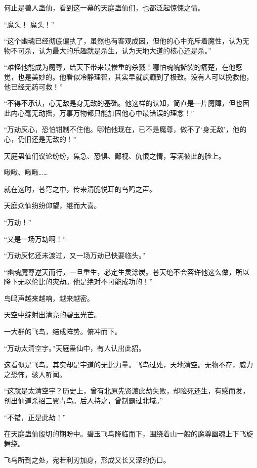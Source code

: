 
\begin{this_body}



何止是兽人蛊仙，看到这一幕的天庭蛊仙们，也都泛起惊悚之情。

“魔头！ 魔头！”

“这个幽魂已经彻底偏执了，虽然也有客观成因，但他的心中充斥着魔性，认为无物不可杀，认为最大的乐趣就是杀生，认为天地大道的核心还是杀。”

“难怪他能成为魔尊，给天下带来最惨重的杀戮！哪怕魂魄撕裂的痛楚，在他感觉，也是美妙的。他看似冷静理智，其实早就疯癫到了极致。没有人可以挽救他，他已经无药可救！”

“不得不承认，心无敌是身无敌的基础。他这样的认知，简直是一片魔障，但也因此内心毫无动摇，万事万物都只能加固他心中最错误的理念！”

“万劫灰心，恐怕钳制不住他。哪怕他现在，已不是魔尊，做不了‘身无敌’，他的心，仍旧还是无敌的！”

天庭蛊仙们议论纷纷，焦急、恐惧、鄙视、仇恨之情，写满彼此的脸上。

啾啾、啾啾……

就在这时，苍穹之中，传来清脆悦耳的鸟鸣之声。

天庭众仙纷纷仰望，继而大喜。

“万劫！”

“又是一场万劫啊！”

“万劫灰忆还未渡过，又一场万劫已快要临头。”

“幽魂魔尊逆天而行，一旦重生，必定生灵涂炭。苍天绝不会容许他这么做，所以降下无以伦比的灾劫。他是绝对不可能成功的！”

鸟鸣声越来越响，越来越密。

天空中绽射出清亮的碧玉光芒。

一大群的飞鸟，结成阵势。俯冲而下。

“万劫太清空宇。”天庭蛊仙中，有人认出此招。

这看似是飞鸟。其实却是宇道的无比力量。飞鸟过处，天地清空。无物不存，威力之恐怖，骇人听闻。

“这就是太清空宇？历史上，曾有北原先贤渡此劫失败，却险死还生，有感而发，创出仙道杀招三翼青鸟。后人持之，曾制霸过北域。”

“不错，正是此劫！”

在天庭蛊仙殷切的期盼中。碧玉飞鸟降临而下，围绕着山一般的魔尊幽魂上下飞旋舞绕。

飞鸟所到之处，宛若利刃加身，形成又长又深的伤口。


\end{this_body}
